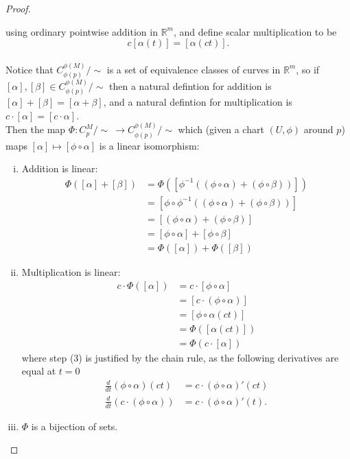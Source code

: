 \documentclass{article}
\begin{document}
\begin{proof}
\begin{enumerate}[(a)]
\[      \] using ordinary pointwise addition in $\mathbb{R}^m$, and define scalar
      multiplication to be \[
        c[\alpha(t)] = [\alpha(ct)].
      \]\\
      Notice that $C_{\phi(p)}^{\phi(M)}/\sim$ is a set of equivalence classes
      of curves in $\mathbb{R}^m$, so if
      $[\alpha], [\beta] \in C_{\phi(p)}^{\phi(M)}/\sim$ then a natural
      defintion for addition is
      $[\alpha] + [\beta] = [\alpha + \beta]$,
      and a natural defintion for multiplication is
      $c \cdot [\alpha] = [c \cdot \alpha]$.\\
      Then the map $\Phi: C_p^M/\sim\ \rightarrow C_{\phi(p)}^{\phi(M)}/\sim$
      which (given a chart $(U, \phi)$ around $p$) maps
      $[\alpha] \mapsto [\phi \circ \alpha]$ is a linear isomorphism:
      \begin{enumerate}[(i)]
        \item Addition is linear: \begin{align*}
          \Phi([\alpha] + [\beta])
          &= \Phi([\phi^{-1}((\phi \circ \alpha) + (\phi \circ \beta))]) \\
          &= [\phi \circ \phi^{-1}((\phi \circ \alpha) + (\phi \circ \beta))]\\
          &= [(\phi \circ \alpha) + (\phi \circ \beta)] \\
          &= [\phi \circ \alpha] + [\phi \circ \beta] \\
          &= \Phi([\alpha]) + \Phi([\beta])
        \end{align*}
        \item Multiplication is linear: \begin{align}
          c\cdot\Phi([\alpha]) &= c\cdot[\phi \circ \alpha] \\
          &= [c \cdot (\phi \circ \alpha)] \\
          &= [\phi \circ \alpha(ct)] \\
          &= \Phi([\alpha(ct)]) \\
          &= \Phi(c\cdot[\alpha])
        \end{align} where step (3) is justified by the chain rule, as the
        following derivatives are equal at $t=0$ \begin{align*}
          \frac{d}{dt}(\phi \circ \alpha)(ct) &= c\cdot(\phi \circ \alpha)'(ct) \\
          \frac{d}{dt}(c\cdot(\phi \circ \alpha)) &= c\cdot(\phi \circ \alpha)'(t).
        \end{align*}
        \item $\Phi$ is a bijection of sets.

\end{enumerate}
\end{enumerate}
\end{proof}
\end{document}
